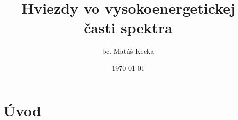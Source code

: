 \documentclass{beamer}
\begin{document}
\title{Hviezdy vo vysokoenergetickej časti spektra }  
\author{bc. Matúš Kocka}
\date{\today} 
\frame{\titlepage} 


\section{Úvod} 
\end{document}
